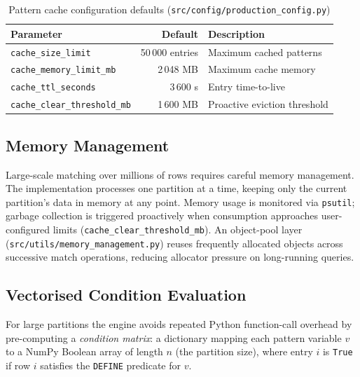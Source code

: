 \begin{table}[htbp]
  \centering
  \caption{Pattern cache configuration defaults
    (\texttt{src/config/production\_config.py})}
  \label{tab:bg-cache-config}
  \begin{tabular}{lrl}
    \toprule
    \textbf{Parameter}         & \textbf{Default} & \textbf{Description} \\
    \midrule
    \texttt{cache\_size\_limit}        & 50\,000 entries  & Maximum cached patterns \\
    \texttt{cache\_memory\_limit\_mb}  & 2\,048 MB        & Maximum cache memory \\
    \texttt{cache\_ttl\_seconds}       & 3\,600 s         & Entry time-to-live \\
    \texttt{cache\_clear\_threshold\_mb} & 1\,600 MB      & Proactive eviction threshold \\
    \bottomrule
  \end{tabular}
\end{table}

\subsection{Memory Management}
\label{subsec:bg-memory}

Large-scale matching over millions of rows requires careful memory
management.  The implementation processes one partition at a time,
keeping only the current partition's data in memory at any point.
Memory usage is monitored via \texttt{psutil}; garbage collection
is triggered proactively when consumption approaches
user-configured limits (\texttt{cache\_clear\_threshold\_mb}).
An object-pool layer (\texttt{src/utils/memory\_management.py})
reuses frequently allocated objects across successive match
operations, reducing allocator pressure on long-running queries.

\subsection{Vectorised Condition Evaluation}
\label{subsec:bg-vectorised}

For large partitions the engine avoids repeated Python function-call
overhead by pre-computing a \emph{condition matrix}: a dictionary
mapping each pattern variable $v$ to a NumPy Boolean array of
length $n$ (the partition size), where entry $i$ is \texttt{True}
if row $i$ satisfies the \texttt{DEFINE} predicate for $v$.


